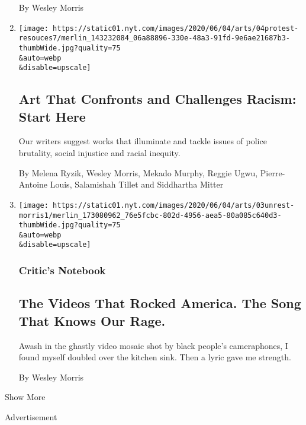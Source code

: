 \begin{enumerate}
  By Wesley Morris
\item
  \href{/2020/06/04/arts/racism-writings-books-movies.html}{}

  \texttt{[image: https://static01.nyt.com/images/2020/06/04/arts/04protest-resouces7/merlin\_143232084\_06a88896-330e-48a3-91fd-9e6ae21687b3-thumbWide.jpg?quality=75\\\&auto=webp\\\&disable=upscale]}

  \hypertarget{art-that-confronts-and-challenges-racism-start-here}{%
  \subsection{Art That Confronts and Challenges Racism: Start
  Here}\label{art-that-confronts-and-challenges-racism-start-here}}

  Our writers suggest works that illuminate and tackle issues of police
  brutality, social injustice and racial inequity.

  By Melena Ryzik, Wesley Morris, Mekado Murphy, Reggie Ugwu,
  Pierre-Antoine Louis, Salamishah Tillet and Siddhartha Mitter
\item
  \href{/2020/06/03/arts/george-floyd-video-racism.html}{}

  \texttt{[image: https://static01.nyt.com/images/2020/06/04/arts/03unrest-morris1/merlin\_173080962\_76e5fcbc-802d-4956-aea5-80a085c640d3-thumbWide.jpg?quality=75\\\&auto=webp\\\&disable=upscale]}

  \hypertarget{critics-notebook-1}{%
  \subsubsection{Critic's Notebook}\label{critics-notebook-1}}

  \hypertarget{the-videos-that-rocked-america-the-song-that-knows-our-rage}{%
  \subsection{The Videos That Rocked America. The Song That Knows Our
  Rage.}\label{the-videos-that-rocked-america-the-song-that-knows-our-rage}}

  Awash in the ghastly video mosaic shot by black people's cameraphones,
  I found myself doubled over the kitchen sink. Then a lyric gave me
  strength.

  By Wesley Morris
\end{enumerate}

Show More

Advertisement

